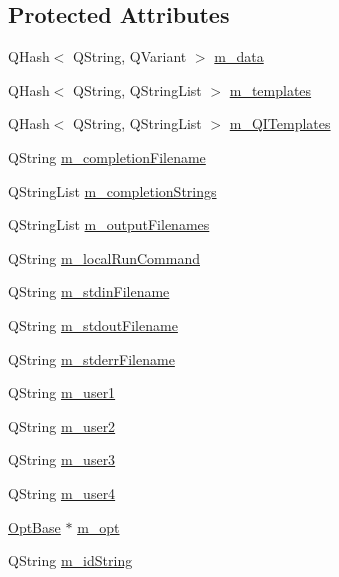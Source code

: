 \subsection*{Protected Attributes}
\begin{DoxyCompactItemize}
\item 
Q\+Hash$<$ Q\+String, Q\+Variant $>$ \hyperlink{classGlobalSearch_1_1Optimizer_a5cf732e34a6eaa4a7b1781d23e6e1c6e}{m\+\_\+data}
\item 
Q\+Hash$<$ Q\+String, Q\+String\+List $>$ \hyperlink{classGlobalSearch_1_1Optimizer_aa5892c64826b7cc7a2baa092efc8c66d}{m\+\_\+templates}
\item 
Q\+Hash$<$ Q\+String, Q\+String\+List $>$ \hyperlink{classGlobalSearch_1_1Optimizer_ac23d5114bf09b816666351868d49d1f8}{m\+\_\+\+Q\+I\+Templates}
\item 
Q\+String \hyperlink{classGlobalSearch_1_1Optimizer_a5e7a476823bc2d4b63939a9ada4f8ed0}{m\+\_\+completion\+Filename}
\item 
Q\+String\+List \hyperlink{classGlobalSearch_1_1Optimizer_a65ee33ee8778c366e8b197e75ae8e674}{m\+\_\+completion\+Strings}
\item 
Q\+String\+List \hyperlink{classGlobalSearch_1_1Optimizer_a28a8bf74bf7bdf00d453890796574c7d}{m\+\_\+output\+Filenames}
\item 
Q\+String \hyperlink{classGlobalSearch_1_1Optimizer_a1cdb6b6c5e929e84c834ba93148fb31e}{m\+\_\+local\+Run\+Command}
\item 
Q\+String \hyperlink{classGlobalSearch_1_1Optimizer_aca91d12d7aecae052d6ab5ae158acec6}{m\+\_\+stdin\+Filename}
\item 
Q\+String \hyperlink{classGlobalSearch_1_1Optimizer_a5ed04fdd5f8b511249e408adcd174550}{m\+\_\+stdout\+Filename}
\item 
Q\+String \hyperlink{classGlobalSearch_1_1Optimizer_a75b800a7f90a03d551f6795404d0c8f1}{m\+\_\+stderr\+Filename}
\item 
Q\+String \hyperlink{classGlobalSearch_1_1Optimizer_ae300aaecb74a7a61a501e4b8bd988957}{m\+\_\+user1}
\item 
Q\+String \hyperlink{classGlobalSearch_1_1Optimizer_a5ca1294d2a3aa119dfab655dfa270d3a}{m\+\_\+user2}
\item 
Q\+String \hyperlink{classGlobalSearch_1_1Optimizer_a279ca8ed61d6ca36f70c5c69b4d57397}{m\+\_\+user3}
\item 
Q\+String \hyperlink{classGlobalSearch_1_1Optimizer_aefab51b84978d2fb49eaf3585894808a}{m\+\_\+user4}
\item 
\hyperlink{classGlobalSearch_1_1OptBase}{Opt\+Base} $\ast$ \hyperlink{classGlobalSearch_1_1Optimizer_a689df6e2c0d8bbfff99585ca54199696}{m\+\_\+opt}
\item 
Q\+String \hyperlink{classGlobalSearch_1_1Optimizer_a4d2dc8b7aaa3bb6fed8c28547460def8}{m\+\_\+id\+String}
\end{DoxyCompactItemize}
